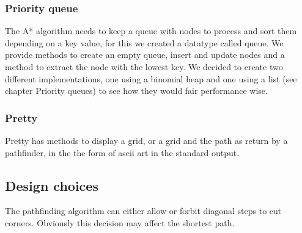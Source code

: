 \documentclass[12pt, a4paper]{article}
\begin{document}
\subsubsection{Priority queue}
The A* algorithm needs to keep a queue with nodes to process and sort them depending on a key value, for this we created a datatype called queue. We provide methods to create an empty queue, insert and update nodes and a method to extract the node with the lowest key. We decided to create two different implementations, one using a binomial heap and one using a list (see chapter Priority queues) to see how they would fair performance wise. 

\subsubsection{Pretty}
Pretty has methods to display a grid, or a grid and the path as return by a pathfinder, in the the form of ascii art in the standard output.






\subsection{Design choices}







The pathfinding algorithm can either allow or forbit diagonal steps to cut
corners. Obviously this decision may affect the shortest path. \cite{astar2}
\end{document}
